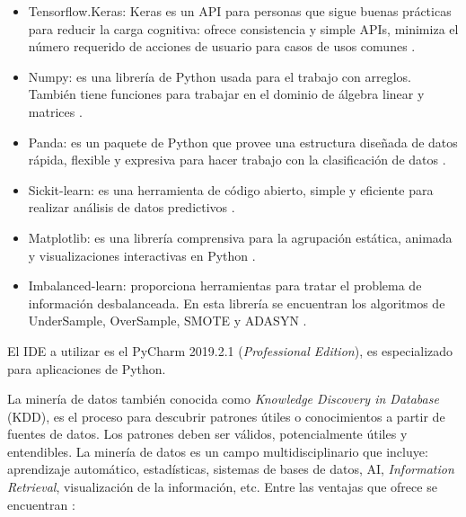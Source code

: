   \begin{itemize}
  	\item Tensorflow.Keras: Keras es un API para personas que sigue buenas pr\'{a}cticas para reducir la carga cognitiva: ofrece consistencia y simple APIs, minimiza el n\'{u}mero requerido de acciones de usuario para casos de usos comunes \cite{22}.
  	\item Numpy: es una librer\'{i}a de Python usada para el trabajo con arreglos. Tambi\'{e}n tiene funciones para trabajar en el dominio de \'{a}lgebra linear y matrices \cite{23}.
  	\item Panda: es un paquete de Python que provee una estructura dise\~{n}ada de datos r\'{a}pida, flexible y expresiva para hacer trabajo con la clasificaci\'{o}n de datos \cite{24}.
  	\item Sickit-learn: es una herramienta de c\'{o}digo abierto, simple y eficiente para realizar an\'{a}lisis de datos predictivos \cite{25}.
  	\item Matplotlib: es una librer\'{i}a comprensiva para la agrupaci\'{o}n est\'{a}tica, animada y visualizaciones interactivas en Python \cite{26}.
  	\item Imbalanced-learn: proporciona herramientas para tratar el problema de informaci\'{o}n desbalanceada. En esta librer\'{i}a se encuentran los algoritmos de UnderSample, OverSample, SMOTE y ADASYN \cite{27}.
  \end{itemize}

  El IDE a utilizar es el PyCharm 2019.2.1 (\textit{Professional Edition})\cite{28}, es especializado para aplicaciones de Python.
  
  La miner\'{i}a de datos tambi\'{e}n conocida como \textit{Knowledge Discovery in Database} (KDD), es el proceso para descubrir patrones \'{u}tiles o conocimientos a partir de fuentes de datos. Los patrones deben ser v\'{a}lidos, potencialmente \'{u}tiles y entendibles. La miner\'{i}a de datos es un campo multidisciplinario que incluye: aprendizaje autom\'{a}tico, estad\'{i}sticas, sistemas de bases de datos, AI, \textit{Information Retrieval}, visualizaci\'{o}n de la informaci\'{o}n, etc. Entre las ventajas que ofrece se encuentran \cite{29}:
  
